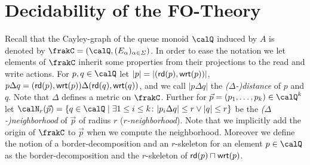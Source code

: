 \section{Decidability of the FO-Theory}\label{sec:decidability}
Recall that the Cayley-graph of the queue monoid $\Qx$ induced by $A$ is denoted by $\frakC=(\Qx,(E_\alpha)_{\alpha\in\Sigma})$.
In order to ease the notation we let elements of $\frakC$ inherit some properties from their projections to the read and write actions. 
For $p,q\in \Qx$ let $|p| = |(\mathsf{rd}(p), \mathsf{wrt}(p))|$, $p\Delta q = (\mathsf{rd}(p), \mathsf{wrt}(p))\Delta (\mathsf{rd}(q), \mathsf{wrt}(q))$, and we call $|p\Delta q|$ the \emph{($\Delta$-)distance} of $p$ and $q$. Note that $\Delta$ defines a metric on $\frakC$. Further for $\vec{p} = (p_1,\ldots,p_k)\in \Qx^k$ let 
$\calN_r(\vec{p}) = \{ q\in \Qx \mid \exists 1\leq i \leq k\colon |p_i\Delta q| \leq r \vee |q| \leq r \}$ be the \emph{($\Delta$-)neighborhood} of $\vec{p}$ of radius $r$ (\emph{$r$-neighborhood}). Note that we implicitly add the origin
of $\frakC$ to $\vec{p}$ when we compute the neighborhood. Moreover we define the notion of a border-decomposition and an $r$-skeleton for an element $p\in\Qx$ as the border-decomposition and the $r$-skeleton of $\mathsf{rd}(p) \sqcap \mathsf{wrt}(p)$.

